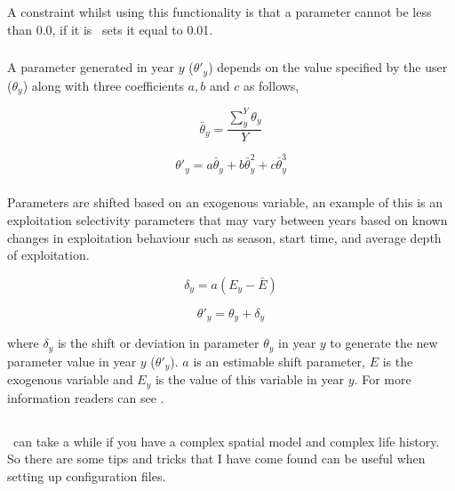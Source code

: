 A constraint whilst using this functionality is that a parameter cannot be less than 0.0, if it is \IBM\ sets it equal to 0.01.

\subsubsection[Annual shift]{}

A parameter generated in year $y$ ($\theta'_y$) depends on the value specified by the user ($\theta_y$) along with three coefficients $a,b$ and $c$ as follows,

\begin{equation}
\bar{\theta}_y = \frac{\sum_{y}^Y\theta_y}{Y}
\end{equation}

\begin{equation}
\theta'_y = a \bar{\theta}_y + b\bar{\theta}_y^{2} + c\bar{\theta}_y^{3}
\end{equation}

\subsubsection[Exogenous]{}

Parameters are shifted based on an exogenous variable, an example of this is an exploitation selectivity parameters that may vary between years based on known changes in exploitation behaviour such as season, start time, and average depth of exploitation.

\begin{equation}
\delta_y = a(E_y - \bar{E})
\end{equation}

\begin{equation}
\theta'_y = \theta_y + \delta_y
\end{equation}

where $\delta_y$ is the shift or deviation in parameter $\theta_y$ in year $y$ to generate the new parameter value in year $y$ ($\theta'_y$). $a$ is an estimable shift parameter, $E$ is the exogenous variable and $E_y$ is the value of this variable in year $y$. For more information readers can see \cite{francis_03}.


\subsection{\label{sec:tips}}
\IBM\ can take a while if you have a complex spatial model and complex life history. So there are some tips and tricks that I have come found can be useful when setting up configuration files.

